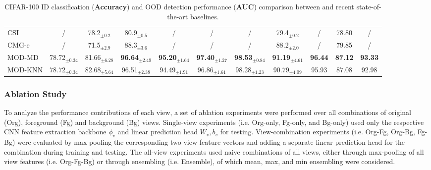 \begin{table}[h!]
{\begin{tabular}{|l|c|cccccc|ccc|}
CSI   & / & 78.2$_{\pm 0.2}$  & 80.9$_{\pm 0.5}$   & /   & /   & / & \multicolumn{1}{c|}{79.4$_{\pm 0.2}$} & /& 78.80 &    /   \\  
CMG-e & /    & 71.5$_{\pm 2.9}$  & 88.3$_{\pm 3.6}$ & /  & /   & /  & \multicolumn{1}{c|}{88.2$_{\pm 2.0}$} & / & 79.85   &  / \\ \hline
MOD-MD & 78.72$_{\pm 0.34}$ & 81.66$_{\pm 6.28}$ & \textbf{96.64}$_{\pm 2.49}$ & \textbf{95.20}$_{\pm 1.64}$ & \textbf{97.40}$_{\pm 1.27}$ & \textbf{98.53}$_{\pm 0.84}$ & \multicolumn{1}{c|}{\textbf{91.19}$_{\pm 4.61}$} & \textbf{96.44} & \textbf{87.12}  &  \textbf{93.33}  \\ 
MOD-KNN & 78.72$_{\pm 0.34}$ & 82.68$_{\pm 5.64}$ & 96.51$_{\pm 2.38}$ & 94.49$_{\pm 1.91}$ & 96.86$_{\pm 1.61}$ & 98.28$_{\pm 1.23}$ & \multicolumn{1}{c|}{90.79$_{\pm 4.09}$} & 95.93 & 87.08  &  92.98  \\ \hline
\end{tabular}
}
\caption{CIFAR-100 ID classification (\textbf{Accuracy}) and OOD detection performance (\textbf{AUC}) comparison between \sysa and recent state-of-the-art baselines. 
}
\label{tab:propwork-mod-results-cifar100}
\end{table}

\subsubsection{Ablation Study}
To analyze the performance contributions of each view, a set of ablation experiments were performed over all combinations of original (Org), foreground (Fg) and background (Bg) views. Single-view experiments (i.e. Org-only, Fg-only, and Bg-only) used only the respective CNN feature extraction backbone $\phi_v$ and linear prediction head $W_v, b_v$ for testing. View-combination experiments (i.e. Org-Fg, Org-Bg, Fg-Bg) were evaluated by max-pooling the corresponding two view feature vectors and adding a separate linear prediction head for the combination during training and testing. The all-view experiments used naive combinations of all views, either through max-pooling of all view features (i.e. Org-Fg-Bg) or through ensembling (i.e. Ensemble), of which mean, max, and min ensembling were considered.
\vspace{3cm}


